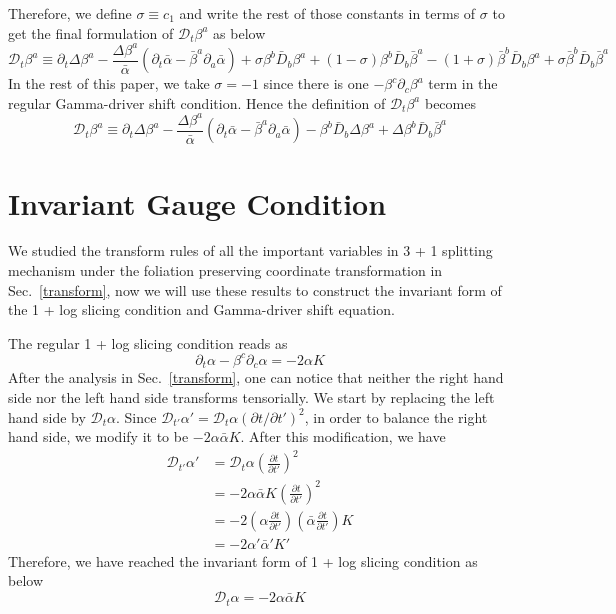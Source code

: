 \documentclass[letterpaper,nofootinbib,prd,amsmath,onecolumn]{revtex4-1}
\begin{document}
Therefore, we define $\sigma \equiv c_{1}$ and write the rest of those constants in terms of $\sigma$ to get the final formulation of $\mathscr{D}_{t}\beta^{a}$ as below
\begin{equation}
\mathscr{D}_{t}\beta^{a} \equiv \partial_{t}\Delta \beta^{a} - \frac{\Delta \beta^{a}}{{\bar \alpha}}(\partial_{t}{\bar \alpha} - {\bar \beta}^{a}\partial_{a}{\bar \alpha}) + \sigma\beta^{b}{\bar D}_{b}\beta^{a} + (1-\sigma)\beta^{b}{\bar D}_{b}{\bar \beta}^{a} - (1 + \sigma){\bar \beta}^{b}{\bar D}_{b}\beta^{a} + \sigma{\bar \beta}^{b}{\bar D}_{b}{\bar \beta}^{a}
\end{equation}
In the rest of this paper, we take $\sigma = -1$ since there is one $-\beta^{c}\partial_{c}\beta^{a}$ term in the regular Gamma-driver shift condition. Hence the definition of $\mathscr{D}_{t}\beta^{a}$ becomes
\begin{equation}
\mathscr{D}_{t}\beta^{a} \equiv \partial_{t}\Delta \beta^{a} - \frac{\Delta \beta^{a}}{{\bar \alpha}}(\partial_{t}{\bar \alpha} - {\bar \beta}^{a}\partial_{a}{\bar \alpha}) - \beta^{b}{\bar D}_{b}\Delta \beta^{a} + \Delta \beta^{b}{\bar D}_{b}{\bar \beta}^{a}
\end{equation}
\section{Invariant Gauge Condition}\label{gauge}
We studied the transform rules of all the important variables in 3 + 1 splitting mechanism under the foliation preserving coordinate transformation in Sec.~\ref{transform}, now we will use these results to construct the invariant form of the 1 + log slicing condition and Gamma-driver shift equation. 

The regular 1 + log slicing condition reads as
\begin{equation}\label{1 + log slicing}
\partial_{t}\alpha - \beta^{c}\partial_{c}\alpha = -2\alpha K
\end{equation}
After the analysis in Sec.~\ref{transform}, one can notice that neither the right hand side nor the left hand side transforms tensorially. We start by replacing the left hand side by $\mathscr{D}_{t}\alpha$. Since $\mathscr{D}_{t'}\alpha' = \mathscr{D}_{t}\alpha(\partial t/\partial t')^{2}$, in order to balance the right hand side, we modify it to be $-2\alpha {\bar \alpha}K$. After this modification, we have
\begin{align*}
\mathscr{D}_{t'}\alpha' & = \mathscr{D}_{t}\alpha\left(\frac{\partial t}{\partial t'}\right)^{2}\\
& = -2\alpha{\bar \alpha}K\left(\frac{\partial t}{\partial t'}\right)^{2}\\
& = -2\left(\alpha\frac{\partial t}{\partial t'}\right)\left({\bar \alpha}\frac{\partial t}{\partial t'}\right)K\\
& = -2\alpha'{\bar \alpha}'K'
\end{align*}
Therefore, we have reached the invariant form of 1 + log slicing condition as below
\begin{equation}\label{invariant 1 + log slicing}
\mathscr{D}_{t}\alpha = -2\alpha{\bar \alpha}K
\end{equation}
\end{document}
